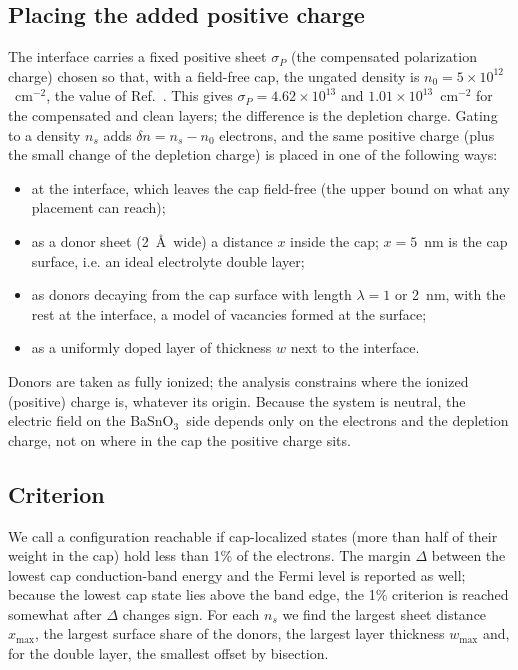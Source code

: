 \documentclass[11pt]{article}
\newcommand{\BSO}{\texorpdfstring{BaSnO$_3$}{BaSnO3}}
\newcommand{\xmax}{x_\mathrm{max}}
\begin{document}
\subsection{Placing the added positive charge}
The interface carries a fixed positive sheet $\sigma_P$ (the compensated polarization charge) chosen so that, with a field-free cap, the ungated density is $n_0=5\times10^{12}$~cm$^{-2}$, the value of Ref.~\cite{Lee2024LIO}. This gives $\sigma_P=4.62\times10^{13}$ and $1.01\times10^{13}$~cm$^{-2}$ for the compensated and clean layers; the difference is the depletion charge. Gating to a density $n_s$ adds $\delta n=n_s-n_0$ electrons, and the same positive charge (plus the small change of the depletion charge) is placed in one of the following ways:
\begin{itemize}
\item at the interface, which leaves the cap field-free (the upper bound on what any placement can reach);
\item as a donor sheet (2~\AA\ wide) a distance $x$ inside the cap; $x=5$~nm is the cap surface, i.e. an ideal electrolyte double layer;
\item as donors decaying from the cap surface with length $\lambda=1$ or 2~nm, with the rest at the interface, a model of vacancies formed at the surface;
\item as a uniformly doped layer of thickness $w$ next to the interface.
\end{itemize}
Donors are taken as fully ionized; the analysis constrains where the ionized (positive) charge is, whatever its origin. Because the system is neutral, the electric field on the \BSO\ side depends only on the electrons and the depletion charge, not on where in the cap the positive charge sits.

\subsection{Criterion}
We call a configuration reachable if cap-localized states (more than half of their weight in the cap) hold less than 1\% of the electrons. The margin $\Delta$ between the lowest cap conduction-band energy and the Fermi level is reported as well; because the lowest cap state lies above the band edge, the 1\% criterion is reached somewhat after $\Delta$ changes sign. For each $n_s$ we find the largest sheet distance $\xmax$, the largest surface share of the donors, the largest layer thickness $w_\mathrm{max}$ and, for the double layer, the smallest offset by bisection.
\end{document}
